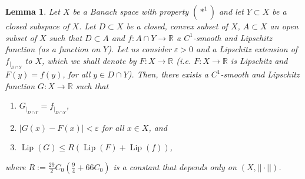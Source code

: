 \documentclass[11pt]{amsart}
\newtheorem{lem}[thm]{Lemma}
\numberwithin{equation}{section}
\begin{document}
\begin{lem}\label{lemma:extension:approximation}
Let $X$ be a Banach space with  property $(*^1)$ and let $Y\subset X$ be a closed subspace of $X$. Let   $D \subset X$ be
a closed, convex subset of $X$, $A\subset X$ an open subset of $X$ such that $D\subset A$ and  $f:A\cap Y\to{\mathbb{R}}$
a $C^1$-smooth and Lipschitz function (as a function on  $Y$). Let us consider $\varepsilon>0$ and a  Lipschitz extension   of $f_{\mid_{D\cap Y}}$ to $X$, which we shall denote by $F:X\to{\mathbb{R}}$  (i.e. $F:X\to{\mathbb{R}}$ is Lipschitz and $F(y)=f(y)$, for all $y\in D\cap Y$). Then,  there exists a $C^1$-smooth and Lipschitz function $G:X\to{\mathbb{R}}$ such that
\begin{enumerate}
\item[(i)] $G_{\mid_{D\cap Y}}=f_{\mid_{D\cap Y}}$,
\item[(ii)] $|G(x)-F(x)|<\varepsilon$ for all $x \in X$, and
\item[(iii)] ${\operatorname{Lip}}(G)\leq R ({\operatorname{Lip}}(F)+{\operatorname{Lip}}(f))$,
\end{enumerate}
where   $R:=\frac{29}{2}C_0(\frac{9}{4}+66C_0) $  is a constant that depends only on $(X, ||\cdot||)$.
\end{lem}
\end{document}
